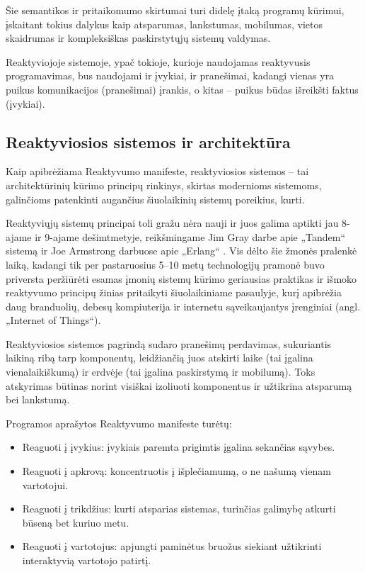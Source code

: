 Šie semantikos ir pritaikomumo skirtumai turi didelę įtaką programų kūrimui, įskaitant tokius dalykus kaip atsparumas, lankstumas, mobilumas, vietos skaidrumas ir kompleksiškas paskirstytųjų sistemų valdymas.

Reaktyviojoje sistemoje, ypač tokioje, kurioje naudojamas reaktyvusis programavimas, bus naudojami ir įvykiai, ir pranešimai, kadangi vienas yra puikus komunikacijos (pranešimai) įrankis, o kitas – puikus būdas išreikšti faktus (įvykiai).

\subsection{Reaktyviosios sistemos ir architektūra}

Kaip apibrėžiama Reaktyvumo manifeste, reaktyviosios sistemos – tai architektūrinių kūrimo principų rinkinys, skirtas modernioms sistemoms, galinčioms patenkinti augančius šiuolaikinių sistemų poreikius, kurti.

Reaktyviųjų sistemų principai toli gražu nėra nauji ir juos galima aptikti jau 8-ajame ir 9-ajame dešimtmetyje, reikšmingame Jim Gray darbe apie „Tandem“ sistemą \cite{Gray85whydo} ir Joe Armstrong darbuose apie „Erlang“ \cite{Armstrong:1997:DE:258948.258967}. Vis dėlto šie žmonės pralenkė laiką, kadangi tik per pastaruosius 5–10 metų technologijų pramonė buvo priversta peržiūrėti esamas įmonių sistemų kūrimo geriausias praktikas ir išmoko reaktyvumo principų žinias pritaikyti šiuolaikiniame pasaulyje, kurį apibrėžia daug branduolių, debesų kompiuterija ir internetu sąveikaujantys įrenginiai (angl. „Internet of Things“).

Reaktyviosios sistemos pagrindą sudaro pranešimų perdavimas, sukuriantis laikiną ribą tarp komponentų, leidžiančią juos atskirti laike (tai įgalina vienalaikiškumą) ir erdvėje (tai įgalina paskirstymą ir mobilumą). Toks atskyrimas būtinas norint visiškai izoliuoti komponentus ir užtikrina atsparumą bei lankstumą.

Programos aprašytos Reaktyvumo manifeste turėtų:

\begin{itemize}
  \item Reaguoti į įvykius: įvykiais paremta prigimtis įgalina sekančias sąvybes.
  \item Reaguoti į apkrovą: koncentruotis į išplečiamumą, o ne našumą vienam vartotojui.
  \item Reaguoti į trikdžius: kurti atsparias sistemas, turinčias galimybę atkurti būseną bet kuriuo metu.
  \item Reaguoti į vartotojus: apjungti paminėtus bruožus siekiant užtikrinti interaktyvią vartotojo patirtį.
\end{itemize}

